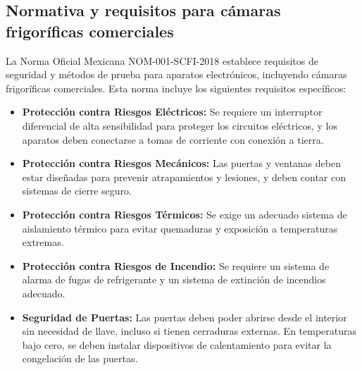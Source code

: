 \subsection{Normativa y requisitos para cámaras frigoríficas comerciales}

La Norma Oficial Mexicana NOM-001-SCFI-2018 establece requisitos de seguridad y métodos de prueba para aparatos electrónicos, incluyendo cámaras frigoríficas comerciales. Esta norma incluye los siguientes requisitos específicos:

\begin{itemize}
	\item \textbf{Protección contra Riesgos Eléctricos:} Se requiere un interruptor diferencial de alta sensibilidad para proteger los circuitos eléctricos, y los aparatos deben conectarse a tomas de corriente con conexión a tierra.
	\item \textbf{Protección contra Riesgos Mecánicos:} Las puertas y ventanas deben estar diseñadas para prevenir atrapamientos y lesiones, y deben contar con sistemas de cierre seguro.
	\item \textbf{Protección contra Riesgos Térmicos:} Se exige un adecuado sistema de aislamiento térmico para evitar quemaduras y exposición a temperaturas extremas.
	\item \textbf{Protección contra Riesgos de Incendio:} Se requiere un sistema de alarma de fugas de refrigerante y un sistema de extinción de incendios adecuado.
	\item \textbf{Seguridad de Puertas:} Las puertas deben poder abrirse desde el interior sin necesidad de llave, incluso si tienen cerraduras externas. En temperaturas bajo cero, se deben instalar dispositivos de calentamiento para evitar la congelación de las puertas.
\end{itemize}
